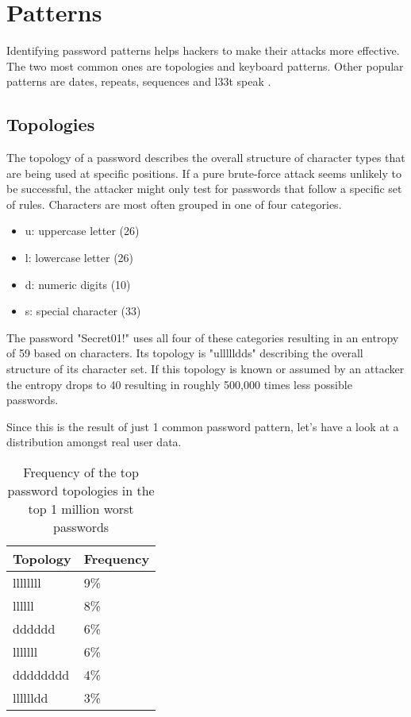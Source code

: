 \section{Patterns}

Identifying password patterns helps hackers to make their attacks more effective. The two most common ones are topologies and keyboard patterns. Other popular patterns are dates, repeats, sequences and l33t speak \cite{zxcvbn}.

\subsection{Topologies}

The topology of a password describes the overall structure of character types that are being used at specific positions. If a pure brute-force attack seems unlikely to be successful, the attacker might only test for passwords that follow a specific set of rules. Characters are most often grouped in one of four categories.

\begin{itemize}
\item u: uppercase letter (26)
\item l: lowercase letter (26)
\item d: numeric digits (10)
\item s: special character (33)
\end{itemize}

The password "Secret01!" uses all four of these categories resulting in an entropy of 59 based on characters. Its topology is "ullllldds" describing the overall structure of its character set. If this topology is known or assumed by an attacker the entropy drops to 40 resulting in roughly 500,000 times less possible passwords.

Since this is the result of just 1 common password pattern, let's have a look at a distribution amongst real user data.

\begin{table}[h!]
\centering
\begin{tabular}{l l}
	Topology	& Frequency \\
	\hline
	llllllll	& 9\% \\
	llllll		& 8\% \\
	dddddd		& 6\% \\
	lllllll		& 6\% \\
	dddddddd	& 4\% \\
	lllllldd	& 3\%
\end{tabular}
\caption{Frequency of the top password topologies in the top 1 million worst passwords \cite{seclist}}
\end{table}

